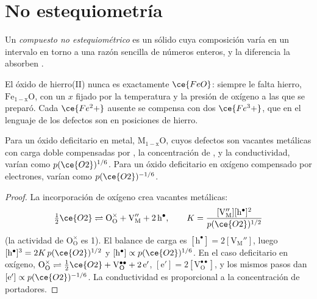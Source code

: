 \section{No estequiometría}

\begin{definition}\label{def:b3:solid-state:non-stoichiometric}
Un \emph{compuesto no estequiométrico} es un
sólido cuya composición varía en un intervalo en torno a una razón sencilla de números
enteros, y la diferencia la absorben .
\end{definition}

El óxido de hierro(II) nunca es exactamente $\ce{FeO}$: siempre le falta hierro,
$\mathrm{Fe_{1-x}O}$, con un $x$ fijado por la temperatura y la presión de oxígeno a las que se preparó. Cada $\ce{Fe^2+}$ ausente se compensa con dos
$\ce{Fe^3+}$, que en el lenguaje de los defectos son  en posiciones de hierro.

\begin{proposition}\label{prop:b3:solid-state:brouwer}
Para un óxido deficitario en metal, $\mathrm{M_{1-x}O}$, cuyos defectos son vacantes metálicas con carga doble
compensadas por , la concentración de , y la conductividad, varían como
$p(\ce{O2})^{1/6}$. Para un óxido deficitario en oxígeno compensado por electrones, varían como
$p(\ce{O2})^{-1/6}$.
\end{proposition}

\begin{proof}
La incorporación de oxígeno crea vacantes metálicas:
\[
  \tfrac12\ce{O2} \rightleftharpoons \mathrm{O_O^{\times} + V_M'' + 2\,h^{\bullet}}, \qquad K = \frac{[\mathrm{V_M''}][\mathrm h^\bullet]^2}{p(\ce{O2})^{1/2}}
\]
(la actividad de $\mathrm{O_O^{\times}}$ es 1). El
balance de carga es $[\mathrm h^\bullet] = 2[\mathrm{V_M''}]$, luego $[\mathrm h^\bullet]^3 = 2K\,p(\ce{O2})^{1/2}$ y $[\mathrm h^\bullet] \propto p(\ce{O2})^{1/6}$. En el
caso deficitario en oxígeno, $\mathrm{O_O^{\times}} \rightleftharpoons \tfrac12\ce{O2} + \mathrm{V_O^{\bullet\bullet} + 2\,e'}$, $[\mathrm e'] = 2[\mathrm{V_O^{\bullet\bullet}}]$, y los mismos pasos dan $[\mathrm e'] \propto p(\ce{O2})^{-1/6}$.
La conductividad es proporcional a la concentración de portadores.
\end{proof}

